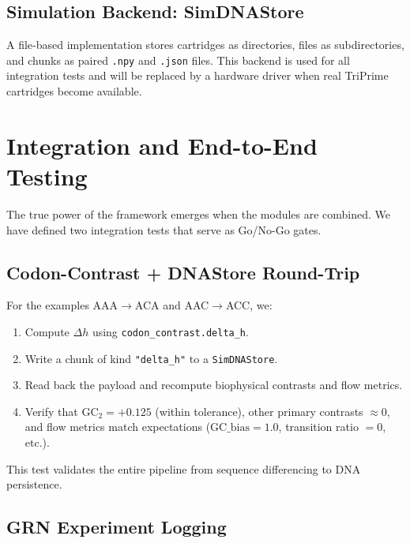 \documentclass[12pt]{article}
\begin{document}
\subsection{Simulation Backend: SimDNAStore}

A file‑based implementation stores cartridges as directories, files as subdirectories, and chunks as paired \texttt{.npy} and \texttt{.json} files. This backend is used for all integration tests and will be replaced by a hardware driver when real TriPrime cartridges become available.

\section{Integration and End-to-End Testing}
\label{sec:integration}

The true power of the framework emerges when the modules are combined. We have defined two integration tests that serve as Go/No-Go gates.

\subsection{Codon-Contrast + DNAStore Round-Trip}

For the examples AAA$\to$ACA and AAC$\to$ACC, we:
\begin{enumerate}
    \item Compute $\Delta h$ using \texttt{codon\_contrast.delta\_h}.
    \item Write a chunk of kind \texttt{"delta\_h"} to a \texttt{SimDNAStore}.
    \item Read back the payload and recompute biophysical contrasts and flow metrics.
    \item Verify that $\text{GC}_2 = +0.125$ (within tolerance), other primary contrasts $\approx 0$, and flow metrics match expectations ($\text{GC\_bias}=1.0$, transition ratio $=0$, etc.).
\end{enumerate}
This test validates the entire pipeline from sequence differencing to DNA persistence.

\subsection{GRN Experiment Logging}
\end{document}
